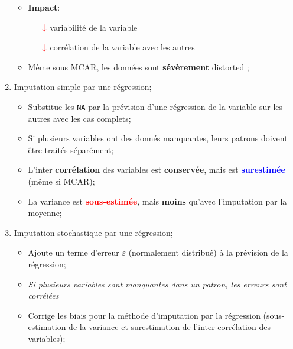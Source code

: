 \documentclass[10pt, french]{article}
\begin{document}
\begin{multicols*}{3}
\begin{enumerate}
\begin{itemize}
		\item	\textbf{Impact}:
			\begin{itemize}
			\item[$\color{red}\downarrow$]	variabilité de la variable	\\
			\item[$\color{red}\downarrow$]	corrélation de la variable avec les autres	\\
			\end{itemize}
		\item	Même sous MCAR, les données sont \textbf{sévèrement} \og distorted \fg{};
		\end{itemize}
	\item	Imputation simple par une régression;
		\begin{itemize}
		\item	Substitue les \texttt{NA} par la prévision d'une régression de la variable sur les autres avec les cas complets;
		\item	Si plusieurs variables ont des donnés manquantes, leurs patrons doivent être traités séparément;
		\item	L'inter \textbf{corrélation} des variables est \textbf{conservée}, mais est \textcolor{blue}{\textbf{surestimée}} (même si MCAR);
		\item	La variance est \textcolor{red}{\textbf{sous-estimée}}, mais \textbf{moins} qu'avec l'imputation par la moyenne;
		\end{itemize}
	\item	Imputation stochastique par une régression;
		\begin{itemize}
		\item	Ajoute un terme d'erreur $\varepsilon$ (normalement distribué) à la prévision de la régression;
		\item	\textit{Si plusieurs variables sont manquantes dans un patron, les erreurs sont corrélées}
		\item	Corrige les biais pour la méthode d'imputation par la régression (sous-estimation de la variance et surestimation de l'inter corrélation des variables);

\end{itemize}
\end{enumerate}
\end{multicols*}
\end{document}
